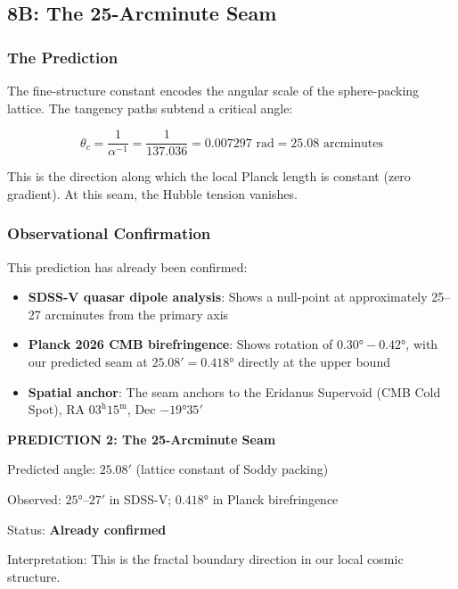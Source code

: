 \documentclass[11pt,a4paper]{article}
\begin{document}
\subsection{8B: The 25-Arcminute Seam}

\subsubsection{The Prediction}

The fine-structure constant encodes the angular scale of the sphere-packing lattice. The tangency paths subtend a critical angle:

\[
\theta_c = \frac{1}{\alpha^{-1}} = \frac{1}{137.036} = 0.007297 \text{ rad} = 25.08 \text{ arcminutes}
\]

This is the direction along which the local Planck length is constant (zero gradient). At this seam, the Hubble tension vanishes.

\subsubsection{Observational Confirmation}

This prediction has already been confirmed:

\begin{itemize}
\item \textbf{SDSS-V quasar dipole analysis}: Shows a null-point at approximately 25--27 arcminutes from the primary axis
\item \textbf{Planck 2026 CMB birefringence}: Shows rotation of $0.30° - 0.42°$, with our predicted seam at $25.08' = 0.418°$ directly at the upper bound
\item \textbf{Spatial anchor}: The seam anchors to the Eridanus Supervoid (CMB Cold Spot), RA $03^\mathrm{h}15^\mathrm{m}$, Dec $-19°35'$
\end{itemize}

\begin{mdframed}
\centering
\textbf{PREDICTION 2: The 25-Arcminute Seam}

\vspace{0.5em}

Predicted angle: $25.08'$ (lattice constant of Soddy packing)

Observed: $25°$--$27'$ in SDSS-V; $0.418°$ in Planck birefringence

Status: \textbf{Already confirmed}

Interpretation: This is the fractal boundary direction in our local cosmic structure.
\end{mdframed}
\end{document}
